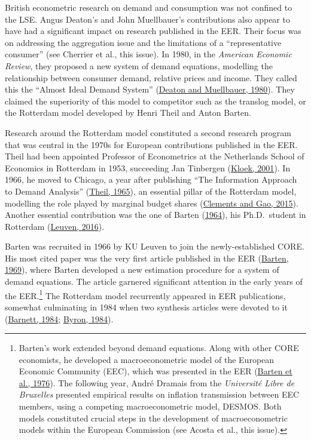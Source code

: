 \documentclass[
  12pt,
  onecolumn]{article}
\begin{document}
British econometric research on demand and consumption was not confined to the LSE. Angus Deaton's and John Muellbauer's contributions also appear to have had a significant impact on research published in the EER. Their focus was on addressing the aggregation issue and the limitations of a ``representative consumer'' (see Cherrier et al., this issue). In 1980, in the \emph{American Economic Review}, they proposed a new system of demand equations, modelling the relationship between consumer demand, relative prices and income. They called this the ``Almost Ideal Demand System'' (\protect\hyperlink{ref-deaton1980}{Deaton and Muellbauer, 1980}). They claimed the superiority of this model to competitor such as the translog model, or the Rotterdam model developed by Henri Theil and Anton Barten.

Research around the Rotterdam model constituted a second research program that was central in the 1970s for European contributions published in the EER. Theil had been appointed Professor of Econometrics at the Netherlands School of Economics in Rotterdam in 1953, succeeding Jan Tinbergen (\protect\hyperlink{ref-kloek2001}{Kloek, 2001}). In 1966, he moved to Chicago, a year after publishing ``The Information Approach to Demand Analysis'' (\protect\hyperlink{ref-theil1965}{Theil, 1965}), an essential pillar of the Rotterdam model, modelling the role played by marginal budget shares (\protect\hyperlink{ref-clements2015a}{Clements and Gao, 2015}). Another essential contribution was the one of Barten (\protect\hyperlink{ref-barten1964}{1964}), his Ph.D.~student in Rotterdam (\protect\hyperlink{ref-kuleuven2016}{Leuven, 2016}).

Barten was recruited in 1966 by KU Leuven to join the newly-established CORE. His most cited paper was the very first article published in the EER (\protect\hyperlink{ref-barten1969}{Barten, 1969}), where Barten developed a new estimation procedure for a system of demand equations. The article garnered significant attention in the early years of the EER.\footnote{Barten's work extended beyond demand equations. Along with other CORE economists, he developed a macroeconometric model of the European Economic Community (EEC), which was presented in the EER (\protect\hyperlink{ref-barten1976}{Barten et al., 1976}). The following year, André Dramais from the \emph{Université Libre de Bruxelles} presented empirical results on inflation transmission between EEC members, using a competing macroeconometric model, DESMOS. Both models constituted crucial steps in the development of macroeconometric models within the European Commission (see Acosta et al., this issue).} The Rotterdam model recurrently appeared in EER publications, somewhat culminating in 1984 when two synthesis articles were devoted to it (\protect\hyperlink{ref-barnett1984}{Barnett, 1984}; \protect\hyperlink{ref-byron1984}{Byron, 1984}).
\end{document}
